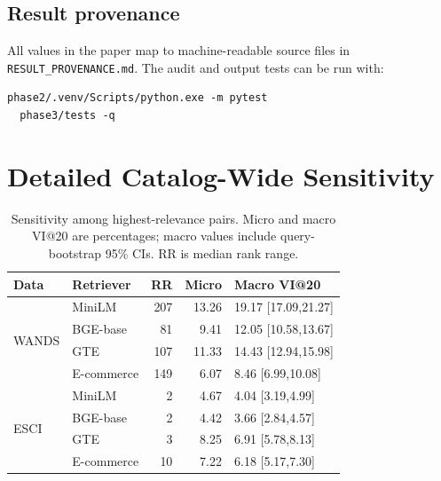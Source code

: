 \subsection{Result provenance}
All values in the paper map to machine-readable source files in \texttt{RESULT\_PROVENANCE.md}. The audit and output tests can be run with:
\begin{verbatim}
phase2/.venv/Scripts/python.exe -m pytest
  phase3/tests -q
\end{verbatim}


\section{Detailed Catalog-Wide Sensitivity}
\begin{table}[H]
\caption{Sensitivity among highest-relevance pairs. Micro and macro VI@20 are percentages; macro values include query-bootstrap 95\% CIs. RR is median rank range.}
\label{tab:sensitivity}
\centering
\small
\begin{tabular}{llrrl}
\toprule
Data & Retriever & RR & Micro & Macro VI@20 \\
\midrule
\multirow{4}{*}{WANDS}
 & MiniLM & 207 & 13.26 & 19.17 [17.09,21.27] \\
 & BGE-base & 81 & 9.41 & 12.05 [10.58,13.67] \\
 & GTE & 107 & 11.33 & 14.43 [12.94,15.98] \\
 & E-commerce & 149 & 6.07 & 8.46 [6.99,10.08] \\
\midrule
\multirow{4}{*}{ESCI}
 & MiniLM & 2 & 4.67 & 4.04 [3.19,4.99] \\
 & BGE-base & 2 & 4.42 & 3.66 [2.84,4.57] \\
 & GTE & 3 & 8.25 & 6.91 [5.78,8.13] \\
 & E-commerce & 10 & 7.22 & 6.18 [5.17,7.30] \\
\bottomrule
\end{tabular}
\end{table}

